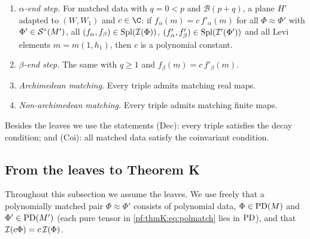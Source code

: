 \begin{definition}
\begin{enumerate}[label=(L\arabic*),leftmargin=*]
configuration, $R,R_1$, $e\in\thmKEv(M,M_1;1,\iota_{H'};I_0)$, $e'\in\thmKEv(M',M'_1;\iota_H,\iota_{H'};I_B)$ and
$K,\mu_K,\mu$ as in \ref{pf:thmK:L:ctsc}, there is $C\ne0$ such that for matched data on $G,G_1$ with $\mathcal B(p+q)$ and
$\Phi\approx\Phi'$ with $\Phi'\in\thmKSo(M')$: $\thmKcone_B\Phi'\in\thmKSo(M'_1)$ and
\[
C\,\thmKst(e_1,e_2,s;\mathfrak b_H,\mathfrak b_{H'};-k_B)\,\thmKLS{k_B+1}{\nu}\,e\Phi\ \approx\ \thmKcone_B\Phi'\quad
\text{on }G_1.
\]
\item\label{pf:thmK:L:endA} \emph{$\alpha$-end step.} For matched data with $q=0<p$ and $\mathcal B(p+q)$, a plane $H'$
adapted to $(W,W_1)$ and $c\in\C$: if $f_\alpha(m)=c\,f'_\alpha(m)$ for all $\Phi\approx\Phi'$ with $\Phi'\in\thmKSo(M')$,
all $(f_\alpha,f_\beta)\in\operatorname{Spl}(\mathcal{I}(\Phi))$, $(f'_\alpha,f'_\beta)\in\operatorname{Spl}(\mathcal{I}'(\Phi'))$ and all Levi elements
$m=m(1,h_1)$, then $c$ is a polynomial constant.
\item\label{pf:thmK:L:endB} \emph{$\beta$-end step.} The same with $q\ge1$ and $f_\beta(m)=c\,f'_\beta(m)$.
\item\label{pf:thmK:L:kreal} \emph{Archimedean matching.} Every triple admits matching real maps.
\item\label{pf:thmK:L:kfin} \emph{Non-archimedean matching.} Every triple admits matching finite maps.
\end{enumerate}
Besides the leaves we use the statements \textup{(Dec)}: every triple satisfies the decay condition; and \textup{(Coi)}:
all matched data satisfy the coinvariant condition.
\end{definition}


\subsection{From the leaves to Theorem K}\label{sec:pf:thmK:induction}

Throughout this subsection we assume the leaves. We use freely that a polynomially matched pair $\Phi\approx\Phi'$
consists of polynomial data, $\Phi\in\operatorname{PD}(M)$ and $\Phi'\in\operatorname{PD}(M')$ (each pure tensor in
\eqref{pf:thmK:eq:polmatch} lies in $\operatorname{PD}$), and that $\mathcal{I}(c\Phi)=c\,\mathcal{I}(\Phi)$.

